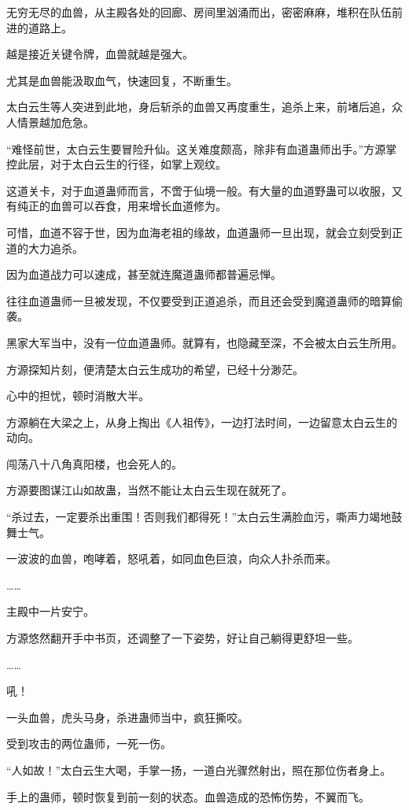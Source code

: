 \begin{this_body}
无穷无尽的血兽，从主殿各处的回廊、房间里汹涌而出，密密麻麻，堆积在队伍前进的道路上。

越是接近关键令牌，血兽就越是强大。

尤其是血兽能汲取血气，快速回复，不断重生。

太白云生等人突进到此地，身后斩杀的血兽又再度重生，追杀上来，前堵后追，众人情景越加危急。

“难怪前世，太白云生要冒险升仙。这关难度颇高，除非有血道蛊师出手。”方源掌控此层，对于太白云生的行径，如掌上观纹。

这道关卡，对于血道蛊师而言，不啻于仙境一般。有大量的血道野蛊可以收服，又有纯正的血兽可以吞食，用来增长血道修为。

可惜，血道不容于世，因为血海老祖的缘故，血道蛊师一旦出现，就会立刻受到正道的大力追杀。

因为血道战力可以速成，甚至就连魔道蛊师都普遍忌惮。

往往血道蛊师一旦被发现，不仅要受到正道追杀，而且还会受到魔道蛊师的暗算偷袭。

黑家大军当中，没有一位血道蛊师。就算有，也隐藏至深，不会被太白云生所用。

方源探知片刻，便清楚太白云生成功的希望，已经十分渺茫。

心中的担忧，顿时消散大半。

方源躺在大梁之上，从身上掏出《人祖传》，一边打法时间，一边留意太白云生的动向。

闯荡八十八角真阳楼，也会死人的。

方源要图谋江山如故蛊，当然不能让太白云生现在就死了。

“杀过去，一定要杀出重围！否则我们都得死！”太白云生满脸血污，嘶声力竭地鼓舞士气。

一波波的血兽，咆哮着，怒吼着，如同血色巨浪，向众人扑杀而来。

……

主殿中一片安宁。

方源悠然翻开手中书页，还调整了一下姿势，好让自己躺得更舒坦一些。

……

吼！

一头血兽，虎头马身，杀进蛊师当中，疯狂撕咬。

受到攻击的两位蛊师，一死一伤。

“人如故！”太白云生大喝，手掌一扬，一道白光骤然射出，照在那位伤者身上。

手上的蛊师，顿时恢复到前一刻的状态。血兽造成的恐怖伤势，不翼而飞。


\end{this_body}
